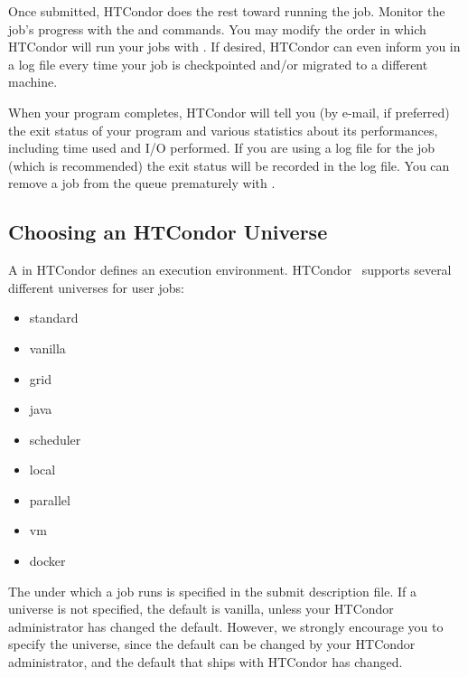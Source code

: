 Once submitted, HTCondor does the rest toward running
the job.
Monitor the job's progress with the 
and  commands.
You may modify the order in which HTCondor will run your jobs with
. If desired, HTCondor can even inform you in a log file 
every time your job is checkpointed and/or migrated to a different machine. 

When your program completes, HTCondor will tell you
(by e-mail, if preferred) the exit status of your program and various
statistics about its performances, including time used and I/O performed.
If you are using a log file for the job (which is recommended) the exit
status will be recorded in the log file.
You can remove a job from the
queue prematurely with . 


\subsection{\label{sec:Choosing-Universe}
Choosing an HTCondor Universe}

A  in HTCondor
defines an execution environment. 
HTCondor \VersionNotice\ supports several different
universes for user jobs:
\begin{itemize}
	\item standard
	\item vanilla
	\item grid
	\item java
	\item scheduler
	\item local
 	\item parallel
 	\item vm
 	\item docker
\end{itemize}

The  under which a job runs
is specified in the submit description file.
If a universe is not specified,
the default is vanilla,
unless your HTCondor administrator has changed the default.
However, we strongly encourage you to specify the universe,
since the default can be changed by your HTCondor administrator,
and the default that ships with HTCondor has changed.

